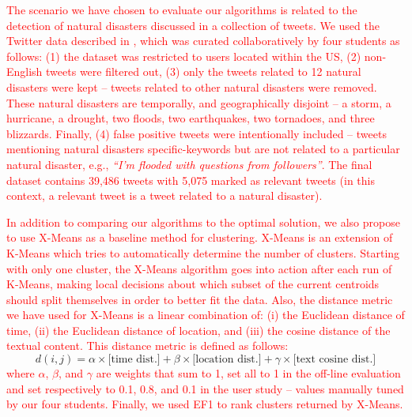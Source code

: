 

\textcolor{red}{The scenario we have chosen to evaluate our algorithms is related to the detection of natural disasters discussed in a collection of tweets.  We used the Twitter data described in  \cite{Iman2017}, which was curated collaboratively by  four students as follows: (1) the dataset was restricted to users located within the US, (2) non-English tweets were filtered out, (3) only the tweets related to 12 natural disasters were kept -- tweets related to other natural disasters were removed. These natural disasters are temporally, and geographically disjoint -- a storm, a hurricane,  a drought, two floods, two earthquakes, two tornadoes,  and three blizzards. Finally, (4) false positive tweets were intentionally included -- tweets mentioning natural disasters specific-keywords but are not related to a particular natural disaster, e.g., \textit{\textquotedblleft I'm flooded with questions from followers\textquotedblright{}}. The final dataset contains 39,486 tweets with 5,075 marked as relevant tweets (in this context, a relevant tweet is a tweet related to a natural disaster).
}

\textcolor{red}{In addition to comparing our algorithms to the optimal solution, we also propose to use X-Means \cite{Pelleg2000} as a baseline method for clustering. X-Means is an extension of K-Means which tries to  automatically determine the number of clusters. Starting with only one cluster, the X-Means algorithm goes into action after each run of K-Means, making local decisions about which subset of the current centroids should split themselves in order to better fit the data. Also, the distance metric we have used for X-Means is a linear combination of: (i) the Euclidean distance of time, (ii) the Euclidean distance of location, and (iii) the cosine distance of the textual content. This distance metric is defined as follows:}
\begin{equation}
d(i,j) = \alpha\times\textrm{[time dist.]}+\beta\times \textrm{[location dist.]}+\gamma\times \textrm{[text cosine dist.]}
\end{equation}
\textcolor{red}{\noindent where $\alpha$, $\beta$, and $\gamma$ are weights that sum to 1, set all to 1 in the off-line evaluation and set respectively to 0.1, 0.8,  and 0.1 in the user study -- values manually tuned by our four students. Finally, we used EF1 to rank clusters returned by X-Means. }


